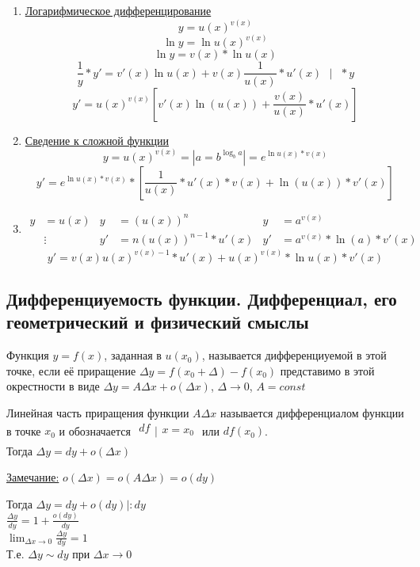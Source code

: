 \documentclass[12pt]{article}
\begin{document}
\begin{enumerate}
        \begin{enumerate}
            \item \underline{Логарифмическое дифференцирование}\\
            \[ y = u(x)^{v(x)} \]
            \[ \ln y = \ln u(x)^{v(x)} \]
            \[ \ln y = v(x) * \ln u(x) \]
            \[ \frac{1}{y} * y' = v'(x)\ln u(x) + v(x)\frac{1}{u(x)}*u'(x) \text{ } \big| \text{ } * y \]
            \[ y' = u(x)^{v(x)}\left[v'(x)\ln(u(x)) + \frac{v(x)}{u(x)} * u'(x)\right] \]
            \item \underline{Сведение к сложной функции}
            \[ y = u(x)^{v(x)} = \left|a = b^{\log_b a}\right| = e^{\ln u(x) * v(x)} \]
            \[ y' = e^{\ln u(x) * v(x)} * \left[ \frac{1}{u(x)} * u'(x)*v(x) + \ln(u(x)) * v'(x) \right] \]
            \item \begin{align*}
                y &= u(x) & y &= (u(x))^n & y &= a^{v(x)}\\
                &\vdots & y' &= n(u(x))^{n-1} * u'(x) & y' &= a^{v(x)} * \ln(a) * v'(x)
            \end{align*}
            \[ y' = v(x)u(x)^{v(x)-1} * u'(x) + u(x)^{v(x)} * \ln u(x) * v'(x) \]
        \end{enumerate}
    \end{enumerate}

    \subsection{Дифференциуемость функции. Дифференциал, его геометрический и физический смыслы}
    Функция $y = f(x)$, заданная в $u(x_0)$, называется дифференциуемой в этой точке, если её приращение $\Delta y = f(x_0 + \Delta) - f(x_0)$ представимо в этой окрестности в виде $\Delta y = A\Delta x + o(\Delta x)$, $\Delta \to 0$, $A = const$\par\noindent
    Линейная часть приращения функции $A\Delta x $ называется дифференциалом функции в точке $x_0$ и обозначается $\begin{matrix}df\\\\\end{matrix}\Big|\begin{matrix}\\x = x_0\\\end{matrix}$ или $df(x_0)$.\\
    Тогда $\Delta y = dy+o(\Delta x)$\par\noindent
    \underline{Замечание:} $o(\Delta x)=o(A\Delta x)=o(dy)$
    \begin{adjustwidth}{1.5em}{1.5em}
        Тогда $\Delta y = dy + o(dy)| : dy$\\
        $\frac{\Delta y}{dy}=1+\frac{o(dy)}{dy}$\\
        $\lim_{\Delta x \to 0}{\frac{\Delta y}{dy}}=1$\\
        Т.е. $\Delta y \sim dy $ при $\Delta x \to 0$
    \end{adjustwidth}
\end{document}
